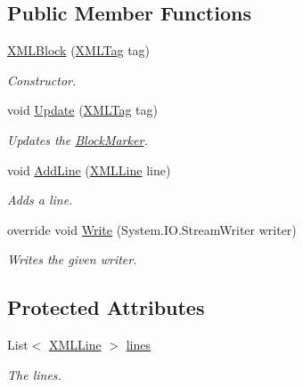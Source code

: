 \subsection*{Public Member Functions}
\begin{DoxyCompactItemize}
\item 
\hyperlink{class_a_rdev_kit_1_1_model_1_1_project_1_1_file_1_1_x_m_l_block_a945d325805b0c5e1d468833bd0e7524a}{X\-M\-L\-Block} (\hyperlink{class_a_rdev_kit_1_1_model_1_1_project_1_1_file_1_1_x_m_l_tag}{X\-M\-L\-Tag} tag)
\begin{DoxyCompactList}\small\item\em Constructor. \end{DoxyCompactList}\item 
void \hyperlink{class_a_rdev_kit_1_1_model_1_1_project_1_1_file_1_1_x_m_l_block_aca74b767b130910446082faf7e150131}{Update} (\hyperlink{class_a_rdev_kit_1_1_model_1_1_project_1_1_file_1_1_x_m_l_tag}{X\-M\-L\-Tag} tag)
\begin{DoxyCompactList}\small\item\em Updates the \hyperlink{class_a_rdev_kit_1_1_model_1_1_project_1_1_file_1_1_block_marker}{Block\-Marker}. \end{DoxyCompactList}\item 
void \hyperlink{class_a_rdev_kit_1_1_model_1_1_project_1_1_file_1_1_x_m_l_block_a5b285d49ca7c69b36b51f74cd521787b}{Add\-Line} (\hyperlink{class_a_rdev_kit_1_1_model_1_1_project_1_1_file_1_1_x_m_l_line}{X\-M\-L\-Line} line)
\begin{DoxyCompactList}\small\item\em Adds a line. \end{DoxyCompactList}\item 
override void \hyperlink{class_a_rdev_kit_1_1_model_1_1_project_1_1_file_1_1_x_m_l_block_a93ad69ccbe004135c2cefca37e9f01db}{Write} (System.\-I\-O.\-Stream\-Writer writer)
\begin{DoxyCompactList}\small\item\em Writes the given writer. \end{DoxyCompactList}\end{DoxyCompactItemize}
\subsection*{Protected Attributes}
\begin{DoxyCompactItemize}
\item 
List$<$ \hyperlink{class_a_rdev_kit_1_1_model_1_1_project_1_1_file_1_1_x_m_l_line}{X\-M\-L\-Line} $>$ \hyperlink{class_a_rdev_kit_1_1_model_1_1_project_1_1_file_1_1_x_m_l_block_a043d163b98a70d26d98d9dda156497bc}{lines}
\begin{DoxyCompactList}\small\item\em The lines. \end{DoxyCompactList}\end{DoxyCompactItemize}
